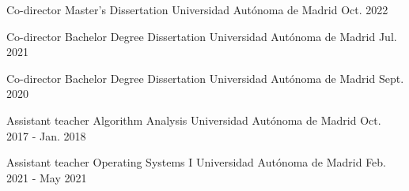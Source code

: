 

\begin{cventries}

  \cventry
    {Co-director} %
    {Master's Dissertation} %
    {Universidad Autónoma de Madrid} %
    {Oct. 2022} %
    {
      \begin{cvitems} %
        \item {}
      \end{cvitems}
    }

  \cventry
    {Co-director} %
    {Bachelor Degree Dissertation} %
    {Universidad Autónoma de Madrid} %
    {Jul. 2021} %
    {
      \begin{cvitems} %
        \item {
        }
      \end{cvitems}
    }

  \cventry
    {Co-director} %
    {Bachelor Degree Dissertation} %
    {Universidad Autónoma de Madrid} %
    {Sept. 2020} %
    {
      \begin{cvitems} %
        \item {}
      \end{cvitems}
    }
    
  \cventry
    {Assistant teacher} %
    {Algorithm Analysis} %
    {Universidad Autónoma de Madrid} %
    {Oct. 2017 - Jan. 2018} %
    {}

  \cventry
    {Assistant teacher} %
    {Operating Systems I} %
    {Universidad Autónoma de Madrid} %
    {Feb. 2021 - May 2021} %
    {}
\end{cventries}

